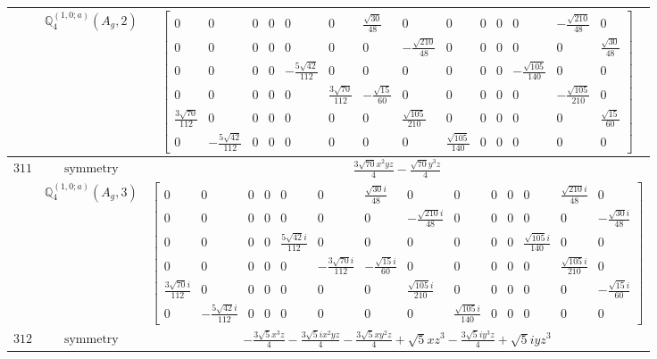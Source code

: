 \documentclass[fleqn,8pt,landscape]{jsarticle}
\begin{document}
\begin{longtable}{ccc}
$  $ & $ \mathbb{Q}_{4}^{(1,0;a)}(A_{g},2) $ & $ \begin{bmatrix} 0 & 0 & 0 & 0 & 0 & 0 & \frac{\sqrt{30}}{48} & 0 & 0 & 0 & 0 & 0 & - \frac{\sqrt{210}}{48} & 0 \\ 0 & 0 & 0 & 0 & 0 & 0 & 0 & - \frac{\sqrt{210}}{48} & 0 & 0 & 0 & 0 & 0 & \frac{\sqrt{30}}{48} \\ 0 & 0 & 0 & 0 & - \frac{5 \sqrt{42}}{112} & 0 & 0 & 0 & 0 & 0 & 0 & - \frac{\sqrt{105}}{140} & 0 & 0 \\ 0 & 0 & 0 & 0 & 0 & \frac{3 \sqrt{70}}{112} & - \frac{\sqrt{15}}{60} & 0 & 0 & 0 & 0 & 0 & - \frac{\sqrt{105}}{210} & 0 \\ \frac{3 \sqrt{70}}{112} & 0 & 0 & 0 & 0 & 0 & 0 & \frac{\sqrt{105}}{210} & 0 & 0 & 0 & 0 & 0 & \frac{\sqrt{15}}{60} \\ 0 & - \frac{5 \sqrt{42}}{112} & 0 & 0 & 0 & 0 & 0 & 0 & \frac{\sqrt{105}}{140} & 0 & 0 & 0 & 0 & 0 \end{bmatrix} $ \\ \hline
$ 311 $ & $ \text{symmetry} $ & $ \frac{3 \sqrt{70} x^{2} y z}{4} - \frac{\sqrt{70} y^{3} z}{4} $ \\
$  $ & $ \mathbb{Q}_{4}^{(1,0;a)}(A_{g},3) $ & $ \begin{bmatrix} 0 & 0 & 0 & 0 & 0 & 0 & \frac{\sqrt{30} i}{48} & 0 & 0 & 0 & 0 & 0 & \frac{\sqrt{210} i}{48} & 0 \\ 0 & 0 & 0 & 0 & 0 & 0 & 0 & - \frac{\sqrt{210} i}{48} & 0 & 0 & 0 & 0 & 0 & - \frac{\sqrt{30} i}{48} \\ 0 & 0 & 0 & 0 & \frac{5 \sqrt{42} i}{112} & 0 & 0 & 0 & 0 & 0 & 0 & \frac{\sqrt{105} i}{140} & 0 & 0 \\ 0 & 0 & 0 & 0 & 0 & - \frac{3 \sqrt{70} i}{112} & - \frac{\sqrt{15} i}{60} & 0 & 0 & 0 & 0 & 0 & \frac{\sqrt{105} i}{210} & 0 \\ \frac{3 \sqrt{70} i}{112} & 0 & 0 & 0 & 0 & 0 & 0 & \frac{\sqrt{105} i}{210} & 0 & 0 & 0 & 0 & 0 & - \frac{\sqrt{15} i}{60} \\ 0 & - \frac{5 \sqrt{42} i}{112} & 0 & 0 & 0 & 0 & 0 & 0 & \frac{\sqrt{105} i}{140} & 0 & 0 & 0 & 0 & 0 \end{bmatrix} $ \\ \hline
$ 312 $ & $ \text{symmetry} $ & $ - \frac{3 \sqrt{5} x^{3} z}{4} - \frac{3 \sqrt{5} i x^{2} y z}{4} - \frac{3 \sqrt{5} x y^{2} z}{4} + \sqrt{5} x z^{3} - \frac{3 \sqrt{5} i y^{3} z}{4} + \sqrt{5} i y z^{3} $ \\

\end{longtable}
\end{document}
